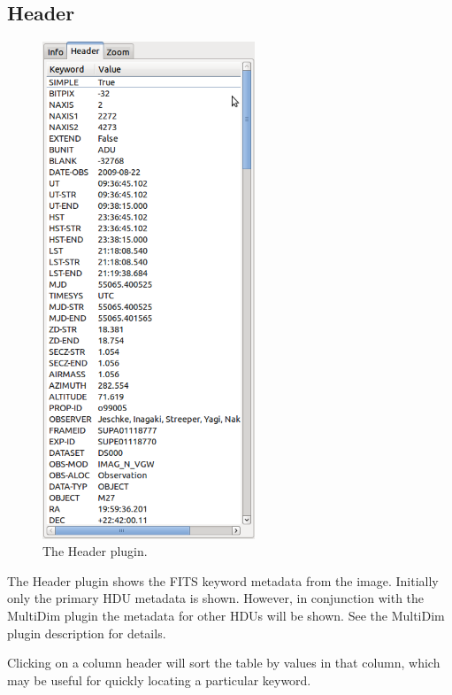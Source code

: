 \documentclass[11pt]{report}
\begin{document}
\subsection{Header}
\begin{figure}
  \includegraphics[width=2.5in]{header-plugin.png}
  \caption[example] 
          { \label{fig:header-plugin} 
            The Header plugin.} 
\end{figure} 
The Header plugin shows the FITS keyword metadata from the image.
Initially only the primary HDU metadata is shown.  However, in
conjunction with the MultiDim plugin the metadata for other HDUs will be
shown.  See the MultiDim plugin description for details.

Clicking on a column header will sort the table by values in that
column, which may be useful for quickly locating a particular keyword.

\newpage
\end{document}
